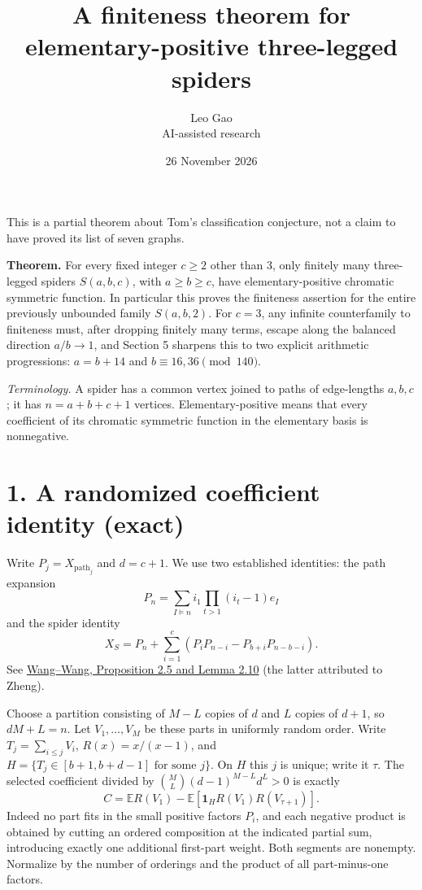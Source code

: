 \documentclass[11pt]{article}
\title{A finiteness theorem for elementary-positive three-legged spiders}
\author{Leo Gao\\\small AI-assisted research}
\date{26 November 2026}
\begin{document}
\maketitle


This
is a partial theorem about Tom's classification conjecture, not a claim
to have proved its list of seven graphs.

\textbf{Theorem.} For every fixed integer \(c\ge2\) other than 3, only
finitely many three-legged spiders \(S(a,b,c)\), with \(a\ge b\ge c\),
have elementary-positive chromatic symmetric function. In particular
this proves the finiteness assertion for the entire previously unbounded
family \(S(a,b,2)\). For \(c=3\), any infinite counterfamily to
finiteness must, after dropping finitely many terms, escape along the
balanced direction \(a/b\to1\), and Section 5 sharpens this to two
explicit arithmetic progressions: \(a=b+14\) and
\(b\equiv16,36\pmod{140}\).

\emph{Terminology.} A spider has a common vertex joined to paths of
edge-lengths \(a,b,c\); it has \(n=a+b+c+1\) vertices.
Elementary-positive means that every coefficient of its chromatic
symmetric function in the elementary basis is nonnegative.

\section*{1. A randomized coefficient identity
(exact)}\label{a-randomized-coefficient-identity-exact}

Write \(P_j=X_{\mathrm{path}_j}\) and \(d=c+1\). We use two established
identities: the path expansion \[
P_n=\sum_{I\vDash n}i_1\prod_{t>1}(i_t-1)e_I
\] and the spider identity \[
X_S=P_n+\sum_{i=1}^c(P_iP_{n-i}-P_{b+i}P_{n-b-i}).
\] See \href{https://arxiv.org/pdf/2112.06619}{Wang--Wang, Proposition
2.5 and Lemma 2.10} (the latter attributed to Zheng).

Choose a partition consisting of \(M-L\) copies of \(d\) and \(L\)
copies of \(d+1\), so \(dM+L=n\). Let \(V_1,\ldots,V_M\) be these parts
in uniformly random order. Write \(T_j=\sum_{i\le j}V_i\),
\(R(x)=x/(x-1)\), and \(H=\{T_j\in[b+1,b+d-1]\text{ for some }j\}\). On
\(H\) this \(j\) is unique; write it \(\tau\). The selected coefficient
divided by \(\binom ML(d-1)^{M-L}d^L>0\) is exactly \[
 C=\mathbb E R(V_1)-\mathbb E[\mathbf1_H R(V_1)R(V_{\tau+1})].
\] Indeed no part fits in the small positive factors \(P_i\), and each
negative product is obtained by cutting an ordered composition at the
indicated partial sum, introducing exactly one additional first-part
weight. Both segments are nonempty. Normalize by the number of orderings
and the product of all part-minus-one factors.
\end{document}
